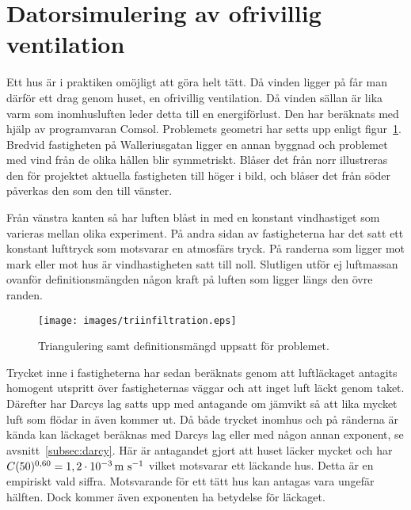 \section{Datorsimulering av ofrivillig ventilation}

Ett hus är i praktiken omöjligt att göra helt tätt. Då vinden ligger på
får man därför ett drag genom huset, en ofrivillig ventilation. Då vinden
sällan är lika varm som inomhusluften leder detta till en energiförlust.
Den har beräknats med hjälp av programvaran Comsol. Problemets geometri har
setts upp enligt figur~\ref{fig:windmethod:tri}. Bredvid fastigheten på Walleriusgatan ligger en annan byggnad och problemet med vind från de olika hållen blir symmetriskt. Blåser det från norr illustreras den för projektet aktuella fastigheten till höger i bild, och blåser det från söder påverkas den som den till vänster.

Från vänstra kanten så har luften blåst in med en konstant vindhastiget som varieras mellan olika
experiment. På andra sidan av fastigheterna har det satt ett konstant lufttryck som motsvarar en
atmosfärs tryck. På randerna som ligger mot mark eller mot hus är vindhastigheten satt till noll.
Slutligen utför ej luftmassan ovanför definitionsmängden någon kraft på luften som ligger längs den
övre randen.

\begin{figure}
\centering
\texttt{[image: images/triinfiltration.eps]}
\caption{Triangulering samt definitionsmängd uppsatt för problemet.}\label{fig:windmethod:tri}
\end{figure}

Trycket inne i fastigheterna har sedan beräknats genom att luftläckaget antagits homogent utspritt över fastigheternas
väggar och att inget luft läckt genom taket. Därefter har Darcys lag satts upp med antagande om jämvikt så att lika mycket
luft som flödar in även kommer ut. Då både trycket inomhus och på ränderna är kända kan läckaget beräknas med Darcys lag
eller med någon annan exponent, se avsnitt~\ref{subsec:darcy}. Här är antagandet gjort att huset läcker mycket och har $C(50)^{0,60} = \unit[1,2\cdot 10^{-3}]{m~s^{-1}}$ vilket motsvarar ett läckande hus. Detta
är en empiriskt vald siffra. Motsvarande för ett tätt hus kan antagas vara ungefär hälften.
Dock kommer även exponenten ha betydelse för läckaget.\cite{sasic}
